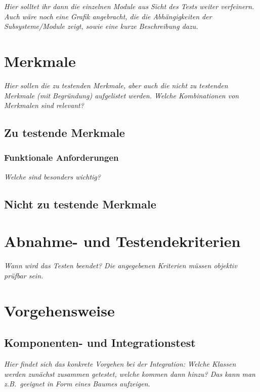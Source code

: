 \documentclass[fontsize=12pt,paper=a4,twoside]{scrartcl}
\begin{document}
{\em Hier solltet ihr dann die einzelnen Module aus Sicht des
Tests weiter verfeinern. Auch wäre noch eine Grafik angebracht, die
die Abhängigkeiten der Subsysteme/Module zeigt, sowie eine kurze
Beschreibung dazu.}


\clearpage

\section{Merkmale}

{\em Hier sollen die zu testenden Merkmale, aber auch die nicht zu
  testenden Merkmale (mit Begründung) aufgelistet werden. Welche
  Kombinationen von Merkmalen sind relevant?}

\subsection{Zu testende Merkmale}\label{c04}



\subsubsection{Funktionale Anforderungen} 

{\em Welche sind besonders wichtig?}

\subsection{Nicht zu testende Merkmale}\label{c05}

\section{Abnahme- und Testendekriterien}\label{c07}

{\em Wann wird das Testen beendet? Die angegebenen Kriterien müssen
  objektiv prüfbar sein.}



\section{Vorgehensweise}\label{c06}

\subsection{Komponenten- und Integrationstest}


{\em Hier findet sich das konkrete Vorgehen bei der Integration: Welche
  Klassen werden zunächst zusammen getestet, welche kommen dann hinzu?
 Das kann man z.B.\ geeignet in Form eines Baumes aufzeigen.}
\end{document}
